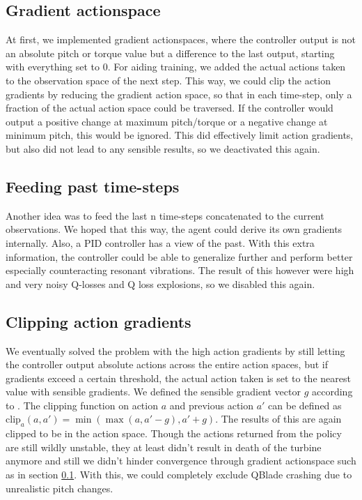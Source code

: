 \documentclass[hyperref,final,beleg]{cgvpub}
\begin{document}
\subsection{Gradient actionspace}
\label{sec:grad_actionspace}

At first, we implemented gradient actionspaces, where the controller output is not an absolute pitch or torque value but a difference to the last output, starting with everything set to 0. For aiding training, we added the actual actions taken to the observation space of the next step. This way, we could clip the action gradients by reducing the gradient action space, so that in each time-step, only a fraction of the actual action space could be traversed. If the controller would output a positive change at maximum pitch/torque or a negative change at minimum pitch, this would be ignored. This did effectively limit action gradients, but also did not lead to any sensible results, so we deactivated this again.

\subsection{Feeding past time-steps}
\label{sec:feedpast}

Another idea was to feed the last n time-steps concatenated to the current observations. We hoped that this way, the agent could derive its own gradients internally. Also, a PID controller has a view of the past. With this extra information, the controller could be able to generalize further and perform better especially counteracting resonant vibrations. The result of this however were high and very noisy Q-losses and Q loss explosions, so we disabled this again.

\subsection{Clipping action gradients}
\label{sec:clip_act_grad}
We eventually solved the problem with the high action gradients by still letting the controller output absolute actions across the entire action spaces, but if gradients exceed a certain threshold, the actual action taken is set to the nearest value with sensible gradients. We defined the sensible gradient vector $g$ according to \cite[Table 7-2]{jonkmanDefinition5MWReference2009}. The clipping function on action $a$ and previous action $a'$ can be defined as $\mathrm{clip}_a(a, a') = \min(\max(a, a' - g), a' + g)$. The results of this are again clipped to be in the action space. Though the actions returned from the policy are still wildly unstable, they at least didn't result in death of the turbine anymore and still we didn't hinder convergence through gradient actionspace such as in section \ref{sec:grad_actionspace}. With this, we could completely exclude QBlade crashing due to unrealistic pitch changes.
\end{document}
